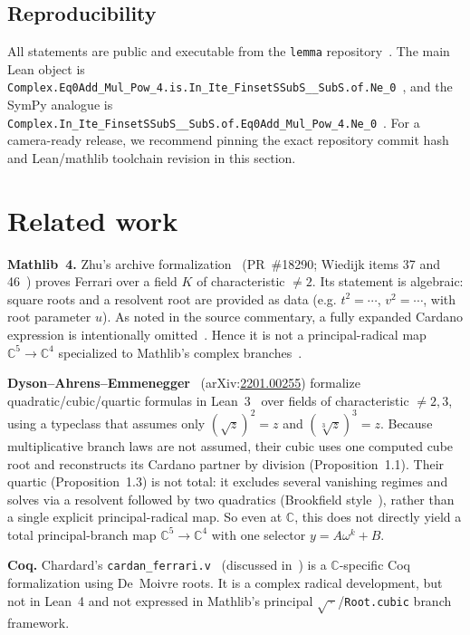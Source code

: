 \documentclass[11pt,a4paper]{article}
\newcommand{\C}{\mathbb{C}}
\begin{document}
\subsection{Reproducibility}
\label{sec:repro}

All statements are public and executable from the \nolinkurl{lemma} repository~\cite{lemma_repo}.
The main Lean object is
\nolinkurl{Complex.Eq0Add_Mul_Pow_4.is.In_Ite_FinsetSSubS__SubS.of.Ne_0}~\cite{lemma_quartic_lean},
and the SymPy analogue is
\nolinkurl{Complex.In_Ite_FinsetSSubS__SubS.of.Eq0Add_Mul_Pow_4.Ne_0}~\cite{lemma_quartic_sympy}.
For a camera-ready release, we recommend pinning the exact repository commit hash and Lean/mathlib toolchain revision in this section.

\section{Related work}
\label{sec:related}

\textbf{Mathlib~4.}
Zhu's archive formalization~\cite{zhu2024mathlibquartic} (PR~\#18290; Wiedijk items 37 and 46~\cite{wiedijk100}) proves Ferrari over a field \(K\) of characteristic \(\neq 2\).
Its statement is algebraic: square roots and a resolvent root are provided as data (e.g.
\(t^2=\cdots\), \(v^2=\cdots\), with root parameter \(u\)).
As noted in the source commentary, a fully expanded Cardano expression is intentionally omitted~\cite{zwillinger2003}.
Hence it is not a principal-radical map \(\C^5\to\C^4\) specialized to Mathlib's complex branches~\cite{mathlib}.

\textbf{Dyson--Ahrens--Emmenegger}~\cite{dyson2022polynomials}
(arXiv:\href{https://arxiv.org/abs/2201.00255}{2201.00255})
formalize quadratic/cubic/quartic formulas in Lean~3~\cite{moura2015lean} over fields of characteristic \(\neq 2,3\), using a typeclass that assumes only
\((\sqrt{z})^2=z\) and \((\sqrt[3]{z})^3=z\).
Because multiplicative branch laws are not assumed, their cubic uses one computed cube root and reconstructs its Cardano partner by division (Proposition~1.1).
Their quartic (Proposition~1.3) is not total: it excludes several vanishing regimes and solves via a resolvent followed by two quadratics (Brookfield style~\cite{brookfield2007}), rather than a single explicit principal-radical map.
So even at \(\C\), this does not directly yield a total principal-branch map \(\C^5\to\C^4\) with one selector \(y=A\omega^k+B\).

\textbf{Coq.}
Chardard's \texttt{cardan\_ferrari.v}~\cite{chardard2021coq} (discussed in~\cite{dyson2022polynomials}) is a \(\C\)-specific Coq formalization using De~Moivre roots.
It is a complex radical development, but not in Lean~4 and not expressed in Mathlib's principal \(\sqrt{\,\cdot\,}\)/\texttt{Root.cubic} branch framework.
\end{document}
